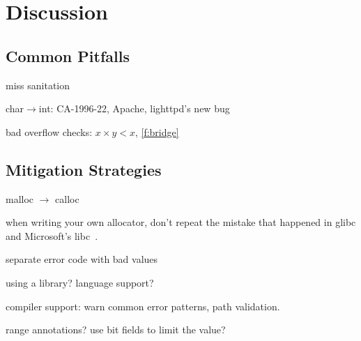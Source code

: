 \section{Discussion}
\label{s:disc}

\subsection{Common Pitfalls}

miss sanitation

char$\to$int: 
CA-1996-22,
Apache,
lighttpd's new bug


bad overflow checks: $x \times y < x$, 
\autoref{f:bridge}

\subsection{Mitigation Strategies}

malloc $\to$ calloc

when writing your own allocator, don't repeat the mistake that
happened in glibc and Microsoft's libc~\cite{rus-cert:calloc}.

separate error code with bad values

using a library? language support?

compiler support: warn common error patterns,
path validation.

range annotations? use bit fields to limit the value?
